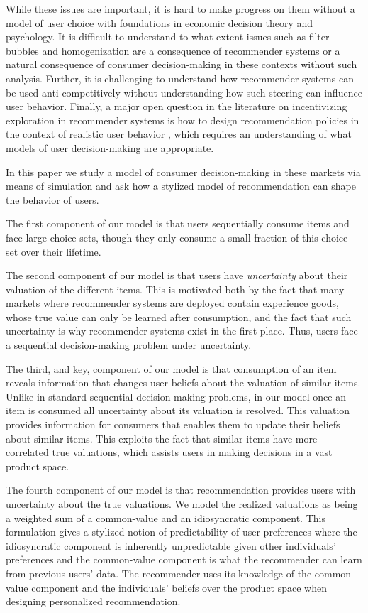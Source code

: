 \documentclass[format=acmsmall, review=false]{acmart}
\newcommand{\xhdr}[1]{\vspace{1mm} \noindent{\bf #1}}
\begin{document}
\par
While these issues are important, it is hard to make progress on them without a model of user choice with foundations in economic decision theory and psychology. It is difficult to understand to what extent issues such as filter bubbles and homogenization are a consequence of recommender systems or a natural consequence of consumer decision-making in these contexts without such analysis. Further, it is challenging to understand how recommender systems can be used anti-competitively without understanding how such steering can influence user behavior. Finally, a major open question in the literature on incentivizing exploration in recommender systems is how to design recommendation policies in the context of realistic user behavior \cite{immorlica2018incentivizing}, which requires an understanding of what models of user decision-making are appropriate.

\xhdr{Our Model} In this paper we study a model of consumer decision-making in these markets via means of simulation and ask how a stylized model of recommendation can shape the behavior of users.
\par
The first component of our model is that users sequentially consume items and face large choice sets, though they only consume a small fraction of this choice set over their lifetime.
\par
The second component of our model is that users have \textit{uncertainty} about their valuation of the different items. This is motivated both by the fact that many markets where recommender systems are deployed contain experience goods, whose true value can only be learned after consumption, and the fact that such uncertainty is why recommender systems exist in the first place. Thus, users face a sequential decision-making problem under uncertainty.
\par 
The third, and key, component of our model is that consumption of an item reveals information that changes user beliefs about the valuation of similar items. Unlike in standard sequential decision-making problems, in our model once an item is consumed all uncertainty about its valuation is resolved. This valuation provides information for consumers that enables them to update their beliefs about similar items. This exploits the fact that similar items have more correlated true valuations, which assists users in making decisions in a vast product space.
\par 
The fourth component of our model is that recommendation provides users with uncertainty about the true valuations. We model the realized valuations as being a weighted sum of a common-value and an idiosyncratic component. This formulation gives a stylized notion of predictability of user preferences where the idiosyncratic component is inherently unpredictable given other individuals' preferences and the common-value component is what the recommender can learn from previous users' data. The recommender uses its knowledge of the common-value component and the individuals' beliefs over the product space when designing personalized recommendation.
\end{document}
